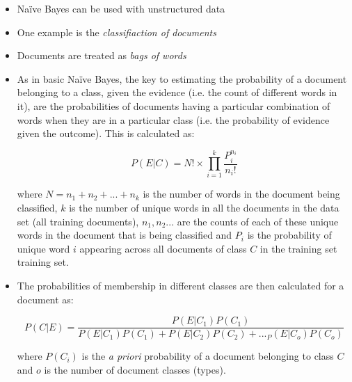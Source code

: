 



\graphicspath{ {../Common/images/} }

\graphicspath{ {images/} }


\pgclrred
\title{}
\author{\vspace{3cm} Institute of Technology Tallaght}
\date{Department of Computing}
\maketitle
\newpage


\begin{itemize}
\item Na\"ive Bayes can be used with unstructured data
\item One example is the \emph{classifiaction of documents}
\item Documents are treated as \emph{bags of words}
\item As in basic Na\"ive Bayes, the key to estimating the probability of a document belonging to a class, given the evidence (i.e. the count of different words in it), are the probabilities of documents having a particular combination of words when they are in a particular class (i.e. the probability of evidence given the outcome). This is calculated as:

  $$P(E|C) = N! \times \prod\limits_{i=1}^k \dfrac{P_i^{n_i}}{n_i!}$$

  where $N = n_1 + n_2 + ... + n_k$ is the number of words in the document being classified, $k$ is the number of unique words in all the documents in the data set (all training documents), $n_1, n_2 ...$ are the counts of each of these unique words in the document that is being classified and $P_i$ is the probability of unique word $i$ appearing across all documents of class $C$ in the training set training set.

\item The probabilities of membership in different classes are then calculated for a document as:

  $$P(C|E) = \dfrac{P(E|C_1)P(C_1)}{P(E|C_1)P(C_1)+P(E|C_2)P(C_2)+..._P(E|C_o)P(C_o)}$$

  where $P(C_i)$ is the \emph{a priori} probability of a document belonging to class $C$ and $o$ is the number of document classes (types).
  
\end{itemize}

